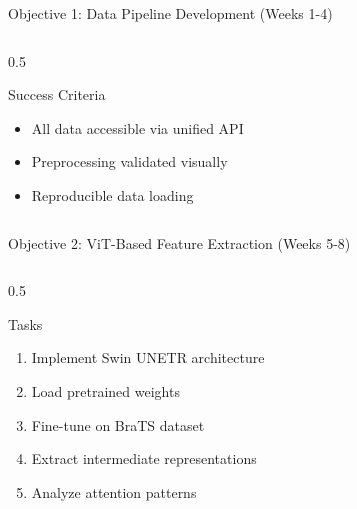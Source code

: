 \documentclass[aspectratio=169]{beamer}
\begin{document}
\begin{frame}{Objective 1: Data Pipeline Development (Weeks 1-4)}
\begin{columns}
\begin{column}{0.5\textwidth}
            \begin{alertblock}{Success Criteria}
                \begin{itemize}
                    \item All data accessible via unified API
                    \item Preprocessing validated visually
                    \item Reproducible data loading
                \end{itemize}
            \end{alertblock}
        \end{column}
    \end{columns}
\end{frame}

\begin{frame}{Objective 2: ViT-Based Feature Extraction (Weeks 5-8)}
    \begin{columns}
        \begin{column}{0.5\textwidth}
            \begin{block}{Tasks}
                \begin{enumerate}
                    \item Implement Swin UNETR architecture
                    \item Load pretrained weights
                    \item Fine-tune on BraTS dataset
                    \item Extract intermediate representations
                    \item Analyze attention patterns
                \end{enumerate}
            \end{block}
            

\end{column}
\end{columns}
\end{frame}
\end{document}
